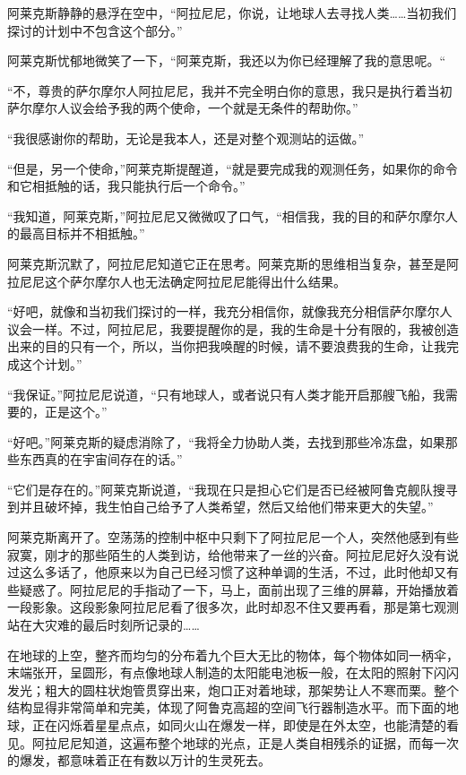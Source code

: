 阿莱克斯静静的悬浮在空中，“阿拉尼尼，你说，让地球人去寻找人类……当初我们探讨的计划中不包含这个部分。”

阿莱克斯忧郁地微笑了一下，“阿莱克斯，我还以为你已经理解了我的意思呢。“

“不，尊贵的萨尔摩尔人阿拉尼尼，我并不完全明白你的意思，我只是执行着当初萨尔摩尔人议会给予我的两个使命，一个就是无条件的帮助你。”

“我很感谢你的帮助，无论是我本人，还是对整个观测站的运做。”

“但是，另一个使命，”阿莱克斯提醒道，“就是要完成我的观测任务，如果你的命令和它相抵触的话，我只能执行后一个命令。”

“我知道，阿莱克斯，”阿拉尼尼又微微叹了口气，“相信我，我的目的和萨尔摩尔人的最高目标并不相抵触。”

阿莱克斯沉默了，阿拉尼尼知道它正在思考。阿莱克斯的思维相当复杂，甚至是阿拉尼尼这个萨尔摩尔人也无法确定阿拉尼尼能得出什么结果。

“好吧，就像和当初我们探讨的一样，我充分相信你，就像我充分相信萨尔摩尔人议会一样。不过，阿拉尼尼，我要提醒你的是，我的生命是十分有限的，我被创造出来的目的只有一个，所以，当你把我唤醒的时候，请不要浪费我的生命，让我完成这个计划。”

“我保证。”阿拉尼尼说道，“只有地球人，或者说只有人类才能开启那艘飞船，我需要的，正是这个。”

“好吧。”阿莱克斯的疑虑消除了，“我将全力协助人类，去找到那些冷冻盘，如果那些东西真的在宇宙间存在的话。”

“它们是存在的。”阿莱克斯说道，“我现在只是担心它们是否已经被阿鲁克舰队搜寻到并且破坏掉，我生怕自己给予了人类希望，然后又给他们带来更大的失望。”

阿莱克斯离开了。空荡荡的控制中枢中只剩下了阿拉尼尼一个人，突然他感到有些寂寞，刚才的那些陌生的人类到访，给他带来了一丝的兴奋。阿拉尼尼好久没有说过这么多话了，他原来以为自己已经习惯了这种单调的生活，不过，此时他却又有些疑惑了。阿拉尼尼的手指动了一下，马上，面前出现了三维的屏幕，开始播放着一段影象。这段影象阿拉尼尼看了很多次，此时却忍不住又要再看，那是第七观测站在大灾难的最后时刻所记录的……

在地球的上空，整齐而均匀的分布着九个巨大无比的物体，每个物体如同一柄伞，末端张开，呈圆形，有点像地球人制造的太阳能电池板一般，在太阳的照射下闪闪发光；粗大的圆柱状炮管贯穿出来，炮口正对着地球，那架势让人不寒而栗。整个结构显得非常简单和完美，体现了阿鲁克高超的空间飞行器制造水平。而下面的地球，正在闪烁着星星点点，如同火山在爆发一样，即使是在外太空，也能清楚的看见。阿拉尼尼知道，这遍布整个地球的光点，正是人类自相残杀的证据，而每一次的爆发，都意味着正在有数以万计的生灵死去。

